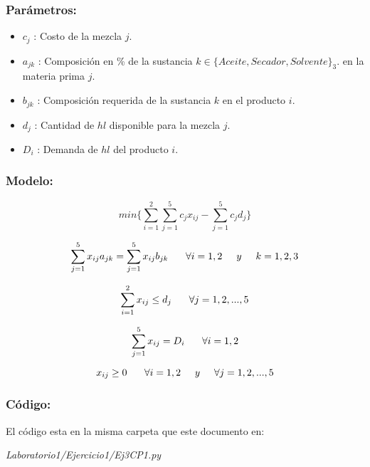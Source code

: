 \documentclass[]{article}
\begin{document}
\subsubsection*{Par\'ametros:}
 
\begin{itemize}
	\item $c_j$ : Costo de la mezcla $j$.
	\item $a_{jk}$ : Composici\'on en \% de la sustancia $k \in \{Aceite,Secador,Solvente\}_3.$ en la materia prima $j$.
	\item $b_{jk}$ : Composici\'on requerida de la sustancia $k$ en el producto $i$.
	\item $d_j$ : Cantidad de $hl$ disponible para la mezcla $j$.
	\item $D_i$ : Demanda de $hl$ del producto $i$.
\end{itemize}

\subsubsection*{Modelo:}

$$ min \{ \sum_{i = 1}^2 \sum_{j = 1}^5 c_j x_{ij} -  \sum_{j=1}^5 c_j d_j\}$$

$$ \sum_{j=1}^5 x_{ij} a_{jk} = \sum_{j=1}^5 x_{ij} b_{jk}\ \hspace{0.5cm}  \forall i=1, 2  \hspace{0.5cm}  y \hspace{0.5cm} k = 1, 2, 3 $$

$$ \sum_{i=1}^2 x_{ij} \leq d_j\ \hspace{0.5cm} \forall j = 1, 2, ..., 5 $$

$$ \sum_{j = 1}^5 x_{ij} = D_i\ \hspace{0.5cm}  \forall i=1, 2 $$

$$ x_{ij} \geq 0\ \hspace{0.5cm}  \forall i = 1,2 \hspace{0.5cm} y \hspace{0.5cm}  \forall j = 1, 2, ..., 5 $$

\subsubsection*{C\'odigo:}

El c\'odigo esta en la misma carpeta que este documento en:

 \textit{ Laboratorio1/Ejercicio1/Ej3CP1.py}
\end{document}
